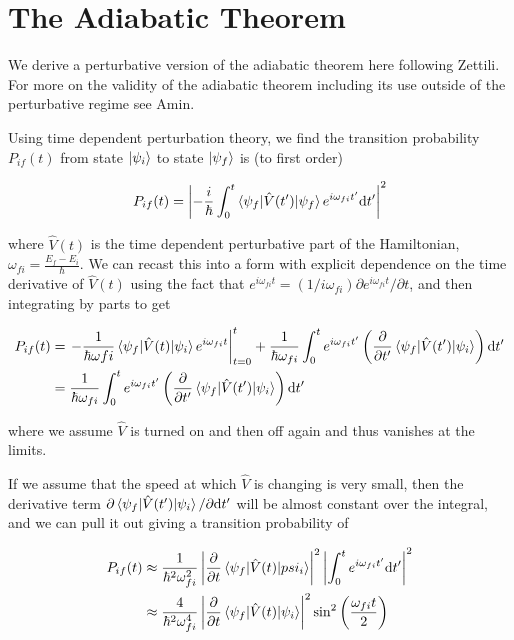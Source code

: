 \appendix
\chapter{The Adiabatic Theorem}
\label{apx:aqc}

We derive a perturbative version of the adiabatic theorem here following Zettili\cite{zettili}.  For more on the validity of the adiabatic theorem including its use outside of the perturbative regime see Amin\cite{amin}.

Using time dependent perturbation theory, we find the transition probability $P_{if}(t)$ from state $\mathinner{|{\psi_i}\rangle}$ to state $\mathinner{|{\psi_f}\rangle}$ is (to first order)\cite{townsend}

\begin{equation}
	P_{if}(t) = \left|-\frac{i}{\hbar}\int_0^t \mathinner{\langle{\psi_f|\hat{V}(t')|\psi_f}\rangle}e^{i\omega_{fi}t'}\mathrm{d}t'\right|^2
\end{equation}

where $\hat{V}(t)$ is the time dependent perturbative part of the Hamiltonian, $\omega_{fi} = \frac{E_f - E_i}{\hbar}$.  We can recast this into a form with explicit dependence on the time derivative of $\hat{V}(t)$ using the fact that $e^{i\omega_{fi}t} = (1/i\omega_{fi})\partial e^{i\omega_{fi}t}/\partial t$, and then integrating by parts to get

\begin{align}
	P_{if}(t) &= \left.-\frac{1}{\hbar\omega{fi}}\mathinner{\langle{\psi_f | \hat{V}(t) | \psi_i}\rangle} e^{i\omega_{fi}t} \right|_{t=0}^t + \frac{1}{\hbar\omega_{fi}} \int_0^t e^{i\omega_{fi}t'} \left( \frac{\partial}{\partial t'} \mathinner{\langle{\psi_f | \hat{V}(t') | \psi_i }\rangle} \right) \mathrm{d} t' \notag\\
	&= \frac{1}{\hbar\omega_{fi}} \int_0^t e^{i\omega_{fi}t'} \left( \frac{\partial}{\partial t'} \mathinner{\langle{\psi_f | \hat{V}(t') | \psi_i}\rangle} \right) \mathrm{d}t'
\end{align}

where we assume $\hat{V}$ is turned on and then off again and thus vanishes at the limits.

If we assume that the speed at which $\hat{V}$ is changing is very small, then the derivative term $\partial\mathinner{\langle{\psi_f | \hat{V}(t') | \psi_i}\rangle}/\partial \mathrm{d}t'$ will be almost constant over the integral, and we can pull it out giving a transition probability of 

\begin{align}
	P_{if}(t) &\approx \frac{1}{\hbar^2\omega_{fi}^2} \left| \frac{\partial}{\partial t} \mathinner{\langle{\psi_f | \hat{V}(t) | psi_i}\rangle} \right|^2 \left| \int_0^t e^{i\omega_{fi}t'} \mathrm{d}t' \right|^2 \notag\\
	&\approx \frac{4}{\hbar^2\omega_{fi}^4} \left| \frac{\partial}{\partial t} \mathinner{\langle{\psi_f | \hat{V}(t) | \psi_i}\rangle} \right|^2 \sin^2\left(\frac{\omega_{fi}t}{2}\right)
\end{align}

